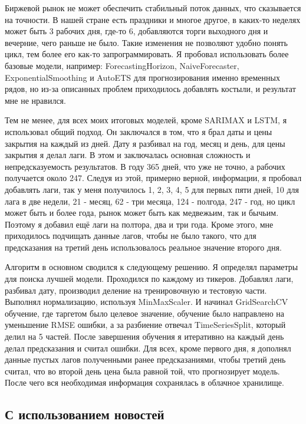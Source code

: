 \documentclass[12pt, a4paper]{article}
\begin{document}
Биржевой рынок не может обеспечить стабильный поток данных, что сказывается на точности. В нашей стране есть праздники и многое другое, в каких-то неделях может быть 3 рабочих дня, где-то 6, добавляются торги выходного дня и вечерние, чего раньше не было. Такие изменения не позволяют удобно понять цикл, тем более его как-то запрограммировать. Я пробовал использовать более базовые модели, например: ForecastingHorizon, NaiveForecaster, ExponentialSmoothing и AutoETS для прогнозирования именно временных рядов, но из-за описанных проблем приходилось добавлять костыли, и результат мне не нравился.

Тем не менее, для всех моих итоговых моделей, кроме SARIMAX и LSTM, я использовал общий подход. Он заключался в том, что я брал даты и цены закрытия на каждый из дней. Дату я разбивал на год, месяц и день, для цены закрытия я делал лаги. В этом и заключалась основная сложность и непредсказуемость результатов. В году 365 дней, что уже не точно, а рабочих получается около 247. Следуя из этой, примерно верной, информации, я пробовал добавлять лаги, так у меня получилось 1, 2, 3, 4, 5 для первых пяти дней, 10 для лага в две недели, 21 - месяц, 62 - три месяца, 124 - полгода, 247 - год, но цикл может быть и более года, рынок может быть как медвежьим, так и бычьим. Поэтому я добавил ещё лаги на полтора, два и три года. Кроме этого, мне приходилось подчищать данные лагов, чтобы не было такого, что для предсказания на третий день использовалось реальное значение второго дня.

Алгоритм в основном сводился к следующему решению. Я определял параметры для поиска лучшей модели. Проходился по каждому из тикеров. Добавлял лаги, разбивал дату, производил деление на тренировочную и тестовую части. Выполнял нормализацию, используя MinMaxScaler. И начинал GridSearchCV обучение, где таргетом было целевое значение, обучение было направлено на уменьшение RMSE ошибки, а за разбиение отвечал TimeSeriesSplit, который делил на 5 частей. После завершения обучения я итеративно на каждый день делал предсказания и считал ошибки. Для всех, кроме первого дня, я дополнял данные пустых лагов полученными ранее предсказаниями, чтобы третий день считал, что во второй день цена была равной той, что прогнозирует модель. После чего вся необходимая информация сохранялась в облачное хранилище.

\subsection{С использованием новостей}
\end{document}
